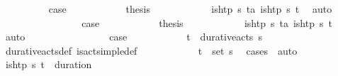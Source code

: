 \begin{isabellebody}
\ \ \ \ \ \ \ \ \isamarkupfalse%
\ {\isacharquery}{\kern0pt}case{}\isanewline
\ \ \ \ \ \ \ \ \isamarkupfalse%
\ \isamarkupfalse%
\ {\isacharquery}{\kern0pt}thesis\isanewline
\ \ \ \ \ \ \ \ \ \ \isamarkupfalse%
\ {\isacartoucheopen}{\isasymnot}is{\isacharunderscore}{\kern0pt}htp\ {\isasympi}s\ t\isactrlsub a{\isacartoucheclose}\ {\isacartoucheopen}is{\isacharunderscore}{\kern0pt}htp\ {\isasympi}s\ t\isactrlsub {\isasympi}{\isacartoucheclose}\ \isamarkupfalse%
\ auto\isanewline
\ \ \ \ \ \ \isamarkupfalse%
\isanewline
\ \ \ \ \ \ \ \ \isamarkupfalse%
\ {\isacharquery}{\kern0pt}case{}\isanewline
\ \ \ \ \ \ \ \ \isamarkupfalse%
\ \isamarkupfalse%
\ {\isacharquery}{\kern0pt}thesis\isanewline
\ \ \ \ \ \ \ \ \ \ \isamarkupfalse%
\ {\isacartoucheopen}{\isasymnot}is{\isacharunderscore}{\kern0pt}htp\ {\isasympi}s\ t\isactrlsub a{\isacartoucheclose}\ {\isacartoucheopen}is{\isacharunderscore}{\kern0pt}htp\ {\isasympi}s\ t\isactrlsub {\isasympi}{\isacartoucheclose}\ \isamarkupfalse%
\ auto\isanewline
\ \ \ \ \ \ \isamarkupfalse%
\isanewline
\ \ \ \ \ \ \ \ \isamarkupfalse%
\ {\isacharquery}{\kern0pt}case{}\isanewline
\ \ \ \ \ \ \ \ \isamarkupfalse%
\ \isamarkupfalse%
\ {\isachardoublequoteopen}{\isacharparenleft}{\kern0pt}t\isactrlsub {\isasympi}{\isacharcomma}{\kern0pt}{\isasympi}{\isacharparenright}{\kern0pt}\ {\isasymin}\ durative{\isacharunderscore}{\kern0pt}acts\ {\isasympi}s{\isachardoublequoteclose}\isanewline
\ \ \ \ \ \ \ \ \ \ \isamarkupfalse%
\ durative{\isacharunderscore}{\kern0pt}acts{\isacharunderscore}{\kern0pt}def\ is{\isacharunderscore}{\kern0pt}act{\isacharunderscore}{\kern0pt}simple{\isacharunderscore}{\kern0pt}def\isanewline
\ \ \ \ \ \ \ \ \ \ \isamarkupfalse%
\ {\isacartoucheopen}{\isacharparenleft}{\kern0pt}t\isactrlsub {\isasympi}{\isacharcomma}{\kern0pt}{\isasympi}{\isacharparenright}{\kern0pt}\ {\isasymin}\ set\ {\isasympi}s{\isacartoucheclose}\ \isamarkupfalse%
\ {\isacharparenleft}{\kern0pt}cases\ {\isasympi}{\isacharparenright}{\kern0pt}\ auto\isanewline
\ \ \ \ \ \ \ \ \isamarkupfalse%
\ \isamarkupfalse%
\ {\isachardoublequoteopen}is{\isacharunderscore}{\kern0pt}htp\ {\isasympi}s\ {\isacharparenleft}{\kern0pt}t\isactrlsub {\isasympi}\ {\isacharplus}{\kern0pt}\ {\isacharparenleft}{\kern0pt}duration\ {\isasympi}{\isacharparenright}{\kern0pt}{\isacharparenright}{\kern0pt}{\isachardoublequoteclose}\isanewline

\end{isabellebody}
